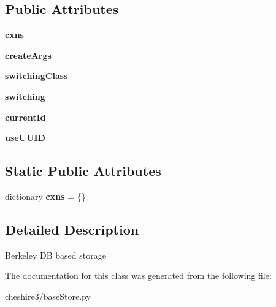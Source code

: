 \subsection*{Public Attributes}
\begin{DoxyCompactItemize}
\item 
\hypertarget{classcheshire3_1_1base_store_1_1_bdb_store_ab212121cbaba91540267777a17dd0066}{{\bfseries cxns}}\label{classcheshire3_1_1base_store_1_1_bdb_store_ab212121cbaba91540267777a17dd0066}

\item 
\hypertarget{classcheshire3_1_1base_store_1_1_bdb_store_a95362c023a9c693ab0f10c3bf91badc0}{{\bfseries create\-Args}}\label{classcheshire3_1_1base_store_1_1_bdb_store_a95362c023a9c693ab0f10c3bf91badc0}

\item 
\hypertarget{classcheshire3_1_1base_store_1_1_bdb_store_a44ac081a9d4d20b7c963de0c80fc3da3}{{\bfseries switching\-Class}}\label{classcheshire3_1_1base_store_1_1_bdb_store_a44ac081a9d4d20b7c963de0c80fc3da3}

\item 
\hypertarget{classcheshire3_1_1base_store_1_1_bdb_store_ad847272fdcd06b61d2ca830aa5147765}{{\bfseries switching}}\label{classcheshire3_1_1base_store_1_1_bdb_store_ad847272fdcd06b61d2ca830aa5147765}

\item 
\hypertarget{classcheshire3_1_1base_store_1_1_bdb_store_a9f622c617c130654347d129acedc29d7}{{\bfseries current\-Id}}\label{classcheshire3_1_1base_store_1_1_bdb_store_a9f622c617c130654347d129acedc29d7}

\item 
\hypertarget{classcheshire3_1_1base_store_1_1_bdb_store_a84b116db9eea8a4c3688054332aad717}{{\bfseries use\-U\-U\-I\-D}}\label{classcheshire3_1_1base_store_1_1_bdb_store_a84b116db9eea8a4c3688054332aad717}

\end{DoxyCompactItemize}
\subsection*{Static Public Attributes}
\begin{DoxyCompactItemize}
\item 
\hypertarget{classcheshire3_1_1base_store_1_1_bdb_store_a7cc18a7478f9a3b63e140cd224e61390}{dictionary {\bfseries cxns} = \{\}}\label{classcheshire3_1_1base_store_1_1_bdb_store_a7cc18a7478f9a3b63e140cd224e61390}

\end{DoxyCompactItemize}


\subsection{Detailed Description}
\begin{DoxyVerb}Berkeley DB based storage \end{DoxyVerb}
 

The documentation for this class was generated from the following file\-:\begin{DoxyCompactItemize}
\item 
cheshire3/base\-Store.\-py\end{DoxyCompactItemize}
